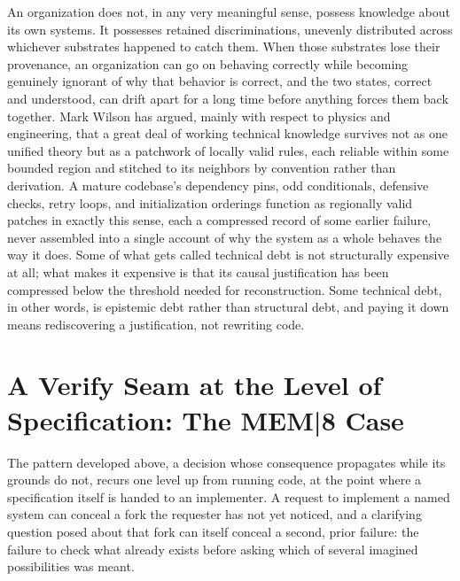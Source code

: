 An organization does not, in any very meaningful sense, possess knowledge about its own systems. It possesses retained discriminations, unevenly distributed across whichever substrates happened to catch them. When those substrates lose their provenance, an organization can go on behaving correctly while becoming genuinely ignorant of why that behavior is correct, and the two states, correct and understood, can drift apart for a long time before anything forces them back together. Mark Wilson has argued, mainly with respect to physics and engineering, that a great deal of working technical knowledge survives not as one unified theory but as a patchwork of locally valid rules, each reliable within some bounded region and stitched to its neighbors by convention rather than derivation. A mature codebase's dependency pins, odd conditionals, defensive checks, retry loops, and initialization orderings function as regionally valid patches in exactly this sense, each a compressed record of some earlier failure, never assembled into a single account of why the system as a whole behaves the way it does. Some of what gets called technical debt is not structurally expensive at all; what makes it expensive is that its causal justification has been compressed below the threshold needed for reconstruction. Some technical debt, in other words, is epistemic debt rather than structural debt, and paying it down means rediscovering a justification, not rewriting code.

\section{A Verify Seam at the Level of Specification: The MEM|8 Case}

The pattern developed above, a decision whose consequence propagates while its grounds do not, recurs one level up from running code, at the point where a specification itself is handed to an implementer. A request to implement a named system can conceal a fork the requester has not yet noticed, and a clarifying question posed about that fork can itself conceal a second, prior failure: the failure to check what already exists before asking which of several imagined possibilities was meant.

